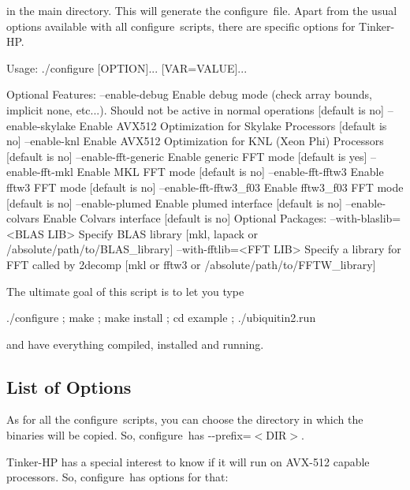 in the main directory. This will generate the {\ttfamily configure} file. Apart from the usual options available with all {\ttfamily configure} scripts, there are specific options for Tinker-\/\-H\-P. \begin{DoxyVerb}Usage: ./configure [OPTION]... [VAR=VALUE]...

Optional Features:
  --enable-debug                Enable debug mode (check array bounds, implicit
                                none, etc...). Should not be active in normal
                                operations [default is no]
  --enable-skylake              Enable AVX512 Optimization for Skylake Processors
                                [default is no]
  --enable-knl                  Enable AVX512 Optimization for KNL (Xeon Phi)
                                Processors [default is no]
  --enable-fft-generic          Enable generic FFT mode [default is yes]
  --enable-fft-mkl              Enable MKL   FFT mode [default is no]
  --enable-fft-fftw3            Enable fftw3 FFT mode [default is no]
  --enable-fft-fftw3_f03        Enable fftw3_f03 FFT mode [default is no]
  --enable-plumed               Enable plumed interface [default is no]
  --enable-colvars              Enable Colvars interface [default is no]
Optional Packages:
  --with-blaslib=<BLAS LIB>     Specify BLAS library [mkl, lapack or 
                                /absolute/path/to/BLAS_library]
  --with-fftlib=<FFT LIB>       Specify a library for FFT called by 2decomp [mkl or
                                fftw3 or /absolute/path/to/FFTW_library]
\end{DoxyVerb}


The ultimate goal of this script is to let you type \begin{DoxyVerb}    ./configure ; make ; make install ; cd example ; ./ubiquitin2.run
\end{DoxyVerb}


and have everything compiled, installed and running.

\subsection*{List of Options}

As for all the {\ttfamily configure} scripts, you can choose the directory in which the binaries will be copied. So, {\ttfamily configure} has {\ttfamily -\/-\/prefix=$<$D\-I\-R$>$}.

Tinker-\/\-H\-P has a special interest to know if it will run on A\-V\-X-\/512 capable processors. So, {\ttfamily configure} has options for that\-:


